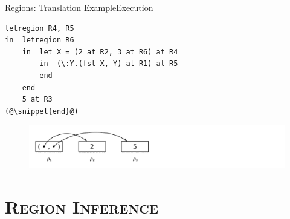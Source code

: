 \documentclass[xcolor=x11names,compress]{beamer}
\newcommand{\snippet}[1] {\textcolor{code}{\texttt{#1}}}
\renewcommand{\(}{\begin{columns}}
\renewcommand{\)}{\end{columns}}
\newcommand{\<}[1]{\begin{column}{#1}}
\renewcommand{\>}{\end{column}}
\begin{document}
\begin{frame}[fragile]{Regions: Translation Example}{Execution}
\begin{lstlisting}
letregion R4, R5
in  letregion R6
    in  let X = (2 at R2, 3 at R6) at R4
        in  (\:Y.(fst X, Y) at R1) at R5
        end
    end
    5 at R3
(@\snippet{end}@)
\end{lstlisting}

\begin{figure}[h]
    \includegraphics[width=\textwidth]{regions-8}
\end{figure}
\end{frame}

\section{\scshape Region Inference}
\end{document}
